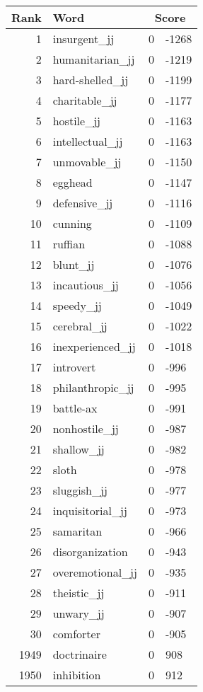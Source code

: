 \begin{longtable}[!htbp]{| rlr@{.}l |}
    \hline
    \textbf{Rank} & \textbf{Word} & \multicolumn{2}{c|}{\textbf{Score}} \\
    \hline
    \endhead
    1 & insurgent\_jj & 0 & -1268 \\
    2 & humanitarian\_jj & 0 & -1219 \\
    3 & hard-shelled\_jj & 0 & -1199 \\
    4 & charitable\_jj & 0 & -1177 \\
    5 & hostile\_jj & 0 & -1163 \\
    6 & intellectual\_jj & 0 & -1163 \\
    7 & unmovable\_jj & 0 & -1150 \\
    8 & egghead & 0 & -1147 \\
    9 & defensive\_jj & 0 & -1116 \\
    10 & cunning & 0 & -1109 \\
    11 & ruffian & 0 & -1088 \\
    12 & blunt\_jj & 0 & -1076 \\
    13 & incautious\_jj & 0 & -1056 \\
    14 & speedy\_jj & 0 & -1049 \\
    15 & cerebral\_jj & 0 & -1022 \\
    16 & inexperienced\_jj & 0 & -1018 \\
    17 & introvert & 0 & -996 \\
    18 & philanthropic\_jj & 0 & -995 \\
    19 & battle-ax & 0 & -991 \\
    20 & nonhostile\_jj & 0 & -987 \\
    21 & shallow\_jj & 0 & -982 \\
    22 & sloth & 0 & -978 \\
    23 & sluggish\_jj & 0 & -977 \\
    24 & inquisitorial\_jj & 0 & -973 \\
    25 & samaritan & 0 & -966 \\
    26 & disorganization & 0 & -943 \\
    27 & overemotional\_jj & 0 & -935 \\
    28 & theistic\_jj & 0 & -911 \\
    29 & unwary\_jj & 0 & -907 \\
    30 & comforter & 0 & -905 \\
    1949 & doctrinaire & 0 & 908 \\
    1950 & inhibition & 0 & 912 \\

\end{longtable}

